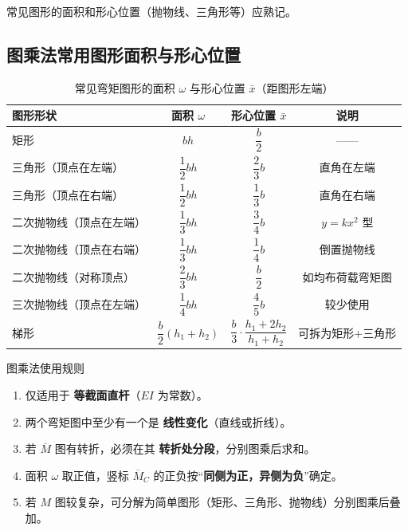 常见图形的面积和形心位置（抛物线、三角形等）应熟记。
\subsection*{图乘法常用图形面积与形心位置}
\begin{table}[htbp]
    \centering
    \caption{常见弯矩图形的面积 \(\omega\) 与形心位置 \(\bar{x}\)（距图形左端）}
    \label{tab:figure-integral}
    \begin{tabular}{@{} l c c c @{}}
        \toprule
        \textbf{图形形状} & \textbf{面积 \(\omega\)} & \textbf{形心位置 \(\bar{x}\)} & \textbf{说明} \\
        \midrule
        矩形 & \(b h\) & \(\dfrac{b}{2}\) & —— \\
        \addlinespace
        三角形（顶点在左端） & \(\dfrac{1}{2} b h\) & \(\dfrac{2}{3} b\) & 直角在左端 \\
        \addlinespace
        三角形（顶点在右端） & \(\dfrac{1}{2} b h\) & \(\dfrac{1}{3} b\) & 直角在右端 \\
        \addlinespace
        二次抛物线（顶点在左端） & \(\dfrac{1}{3} b h\) & \(\dfrac{3}{4} b\) & \(y = kx^2\) 型 \\
        \addlinespace
        二次抛物线（顶点在右端） & \(\dfrac{1}{3} b h\) & \(\dfrac{1}{4} b\) & 倒置抛物线 \\
        \addlinespace
        二次抛物线（对称顶点） & \(\dfrac{2}{3} b h\) & \(\dfrac{b}{2}\) & 如均布荷载弯矩图 \\
        \addlinespace
        三次抛物线（顶点在左端） & \(\dfrac{1}{4} b h\) & \(\dfrac{4}{5} b\) & 较少使用 \\
        \addlinespace
        梯形 & \(\dfrac{b}{2}(h_1+h_2)\) & \(\dfrac{b}{3}\cdot\dfrac{h_1+2h_2}{h_1+h_2}\) & 可拆为矩形+三角形 \\
        \bottomrule
    \end{tabular}
\end{table}





\begin{myhypothesis}{图乘法使用规则}
    \begin{enumerate}
        \item 仅适用于 \textbf{等截面直杆}（\(EI\) 为常数）。
        \item 两个弯矩图中至少有一个是 \textbf{线性变化}（直线或折线）。
        \item 若 \(\overline{M}\) 图有转折，必须在其 \textbf{转折处分段}，分别图乘后求和。
        \item 面积 \(\omega\) 取正值，竖标 \(\overline{M}_C\) 的正负按“\textbf{同侧为正，异侧为负}”确定。
        \item 若 \(M\) 图较复杂，可分解为简单图形（矩形、三角形、抛物线）分别图乘后叠加。
    \end{enumerate}
\end{myhypothesis}

